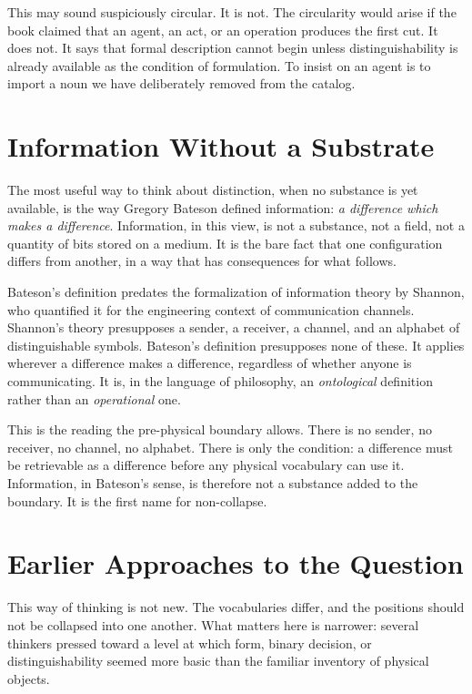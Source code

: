 \documentclass[11pt,a4paper]{book}
\begin{document}
This may sound suspiciously circular. It is not. The circularity would arise if the book claimed that an agent, an act, or an operation produces the first cut. It does not. It says that formal description cannot begin unless distinguishability is already available as the condition of formulation. To insist on an agent is to import a noun we have deliberately removed from the catalog.

\section*{Information Without a Substrate}

The most useful way to think about distinction, when no substance is yet available, is the way Gregory Bateson defined information: \emph{a difference which makes a difference}. Information, in this view, is not a substance, not a field, not a quantity of bits stored on a medium. It is the bare fact that one configuration differs from another, in a way that has consequences for what follows.

Bateson's definition predates the formalization of information theory by Shannon, who quantified it for the engineering context of communication channels. Shannon's theory presupposes a sender, a receiver, a channel, and an alphabet of distinguishable symbols. Bateson's definition presupposes none of these. It applies wherever a difference makes a difference, regardless of whether anyone is communicating. It is, in the language of philosophy, an \emph{ontological} definition rather than an \emph{operational} one.

This is the reading the pre-physical boundary allows. There is no sender, no receiver, no channel, no alphabet. There is only the condition: a difference must be retrievable as a difference before any physical vocabulary can use it. Information, in Bateson's sense, is therefore not a substance added to the boundary. It is the first name for non-collapse.

\section*{Earlier Approaches to the Question}

This way of thinking is not new. The vocabularies differ, and the positions should not be collapsed into one another. What matters here is narrower: several thinkers pressed toward a level at which form, binary decision, or distinguishability seemed more basic than the familiar inventory of physical objects.
\end{document}
